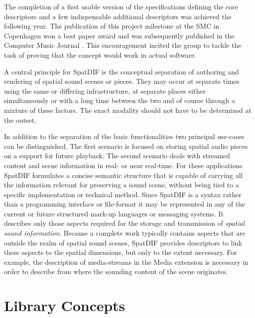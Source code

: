 \documentclass{article}
\begin{document}
The completion of a first usable version of the specifications \cite{SpatDIF_03} defining the core descriptors and a few indispensable additional descriptors was achieved the following year. The publication of this project milestone at the SMC in Copenhagen \cite{SpatDIF_SMC12} won a best paper award and was subsequently published in the Computer Music Journal \cite{Peters:2013SpatDifCMJ}.
This encouragement incited the group to tackle the task of proving that the concept would work in actual software.

A central principle for SpatDIF is the conceptual separation of authoring and rendering of spatial sound scenes or pieces. They may occur at separate times using the same or differing infrastructure, at separate places either simultaneously or with a long time between the two and of course through a mixture of these factors. 
The exact modality should not have to be determined at the outset.

In addition to the separation of the basic functionalities two principal use-cases can be distinguished.
The first scenario is focused on storing spatial audio pieces on a support for future playback. 
The second scenario deals with streamed content and scene information in real- or near real-time.
For these applications SpatDIF formulates a concise semantic structure that is capable of carrying all the information relevant for preserving a sound scene, without being tied to a specific implementation or technical method.
Since SpatDIF is a syntax rather than a programming interface or file-format it may be represented in any of the current or future structured mark-up languages or messaging systems.
It describes only those aspects required for the storage and transmission of \emph{spatial sound information}.
Because a complete work typically contains aspects that are outside the realm of spatial sound scenes, SpatDIF provides descriptors to link these aspects to the spatial dimensions, but only to the extent necessary.
For example, the description of media-streams in the Media extension is necessary in order to describe from where the sounding content of the scene originates.

\section{Library Concepts}\label{sec:libspatdif_concepts}
\end{document}
